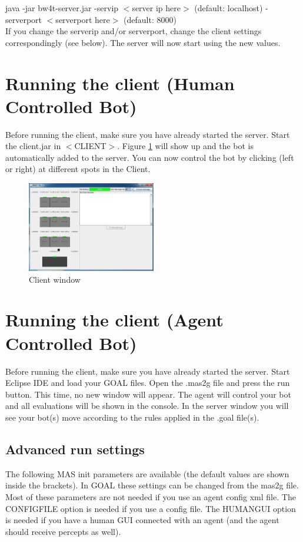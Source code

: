 \documentclass[11pt,a4paper]{article}
\begin{document}
java -jar bw4t-server.jar -servip $<$server ip here$>$ (default: localhost) -serverport $<$serverport here$>$ (default: 8000)\\

If you change the serverip and/or serverport, change the client settings correspondingly (see below).
The server will now start using the new values.

\section{Running the client (Human Controlled Bot)}
Before running the client, make sure you have already started the server. Start the client.jar in $<$CLIENT$>$. Figure \ref{fig:Client} will show up and the bot is automatically added to the server. You can now control the bot by clicking (left or right) at different spots in the Client.

\begin{figure}
\begin{center}
\includegraphics[width=0.5\textwidth]{client.png}
\end{center}
  \caption{Client window}\label{fig:Client}
\end{figure}

\section{Running the client (Agent Controlled Bot)}
Before running the client, make sure you have already started the server. Start Eclipse IDE and load your GOAL files. Open the .mas2g file and press the run button. This time, no new window will appear. The agent will control your bot and all evaluations will be shown in the console. In the server window you will see your bot(s) move according to the rules applied in the .goal file(s).

\subsection{Advanced run settings}
The following MAS init parameters are available (the default values are shown inside the brackets). In GOAL these settings can be changed from the mas2g file. Most of  these parameters are not needed if you use an agent config xml file. The CONFIGFILE option is needed if you use a config file. The HUMANGUI option is needed if you have a human GUI connected with an agent (and the agent should receive percepts as well). 
\end{document}
